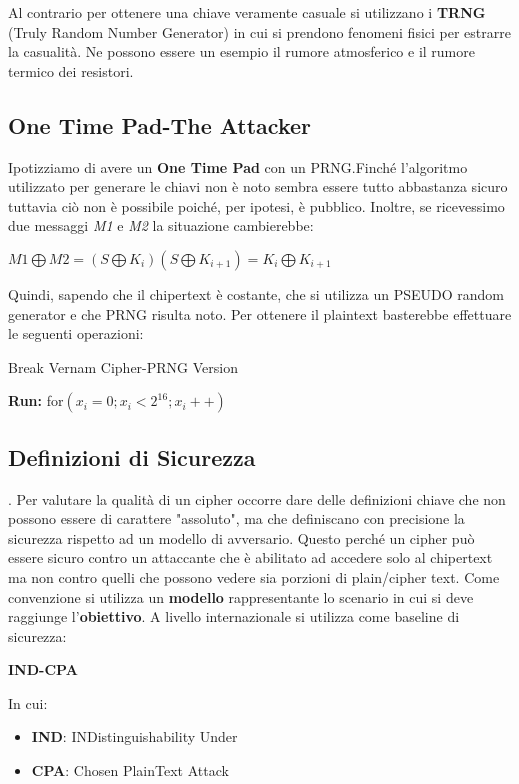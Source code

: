 \documentclass{article}
\theoremstyle{remark}
\begin{document}
Al contrario per ottenere una chiave veramente casuale si utilizzano i \textbf{TRNG} (Truly Random Number Generator) in cui si prendono fenomeni fisici per estrarre la casualità. Ne possono essere un esempio il rumore atmosferico e il rumore termico dei resistori. 
\subsection{One Time Pad-The Attacker}
Ipotizziamo di avere un \textbf{One Time Pad} con un PRNG.Finché l'algoritmo utilizzato per generare le chiavi non è noto sembra essere tutto abbastanza sicuro tuttavia ciò non è possibile poiché, per ipotesi, è pubblico. Inoltre, se ricevessimo due messaggi \emph{M1} e \emph{M2} la situazione cambierebbe:
\begin{center}
    \(M1\bigoplus M2 = (S\bigoplus K_i)(S\bigoplus K_{i+1}) = K_i\bigoplus K_{i+1}\)
\end{center}
Quindi, sapendo che il chipertext è costante, che si utilizza un PSEUDO random generator e che PRNG risulta noto. Per ottenere il plaintext basterebbe effettuare le seguenti operazioni:
\begin{algorithm}
\caption{Break Vernam Cipher-PRNG Version}\label{alg:cap}
\begin{algorithmic}
\State\textbf{Run:} for\((x_i=0;x_i<2^{16};x_i++)\)
{}
\end{algorithmic}
\end{algorithm}
\subsection{Definizioni di Sicurezza}.
Per valutare la qualità di un cipher occorre dare delle definizioni chiave che non possono essere di carattere "assoluto", ma che definiscano con precisione la sicurezza rispetto ad un modello di avversario. Questo perché un cipher può essere sicuro contro un attaccante che è abilitato ad accedere solo al chipertext ma non contro quelli che possono vedere sia porzioni di plain/cipher text. Come convenzione si utilizza un \textbf{modello} rappresentante lo scenario in cui si deve raggiunge l'\textbf{obiettivo}.
A livello internazionale si utilizza come baseline di sicurezza:
\begin{center}
    \textbf{IND-CPA}
\end{center}
In cui:\begin{itemize}
    \item \textbf{IND}: INDistinguishability \newline
    Under
    \item \textbf{CPA}: Chosen PlainText Attack
\end{itemize}
\end{document}
